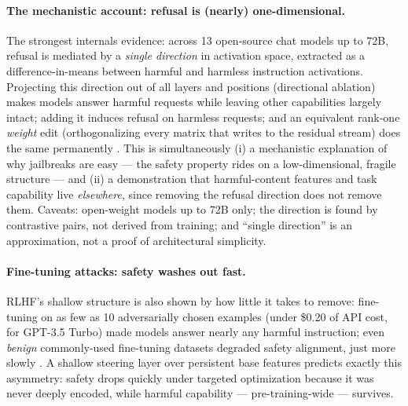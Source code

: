 \documentclass[11pt]{article}
\begin{document}
\paragraph{The mechanistic account: refusal is (nearly) one-dimensional.} The strongest internals evidence: across 13 open-source chat models up to 72B, refusal is mediated by a \emph{single direction} in activation space, extracted as a difference-in-means between harmful and harmless instruction activations. Projecting this direction out of all layers and positions (directional ablation) makes models answer harmful requests while leaving other capabilities largely intact; adding it induces refusal on harmless requests; and an equivalent rank-one \emph{weight} edit (orthogonalizing every matrix that writes to the residual stream) does the same permanently \cite{arditi2024refusal}. This is simultaneously (i) a mechanistic explanation of why jailbreaks are easy --- the safety property rides on a low-dimensional, fragile structure --- and (ii) a demonstration that harmful-content features and task capability live \emph{elsewhere}, since removing the refusal direction does not remove them. Caveats: open-weight models up to 72B only; the direction is found by contrastive pairs, not derived from training; and ``single direction'' is an approximation, not a proof of architectural simplicity.

\paragraph{Fine-tuning attacks: safety washes out fast.} RLHF's shallow structure is also shown by how little it takes to remove: fine-tuning on as few as 10 adversarially chosen examples (under \$0.20 of API cost, for GPT-3.5 Turbo) made models answer nearly any harmful instruction; even \emph{benign} commonly-used fine-tuning datasets degraded safety alignment, just more slowly \cite{qi2024fine}. A shallow steering layer over persistent base features predicts exactly this asymmetry: safety drops quickly under targeted optimization because it was never deeply encoded, while harmful capability --- pre-training-wide --- survives.
\end{document}
